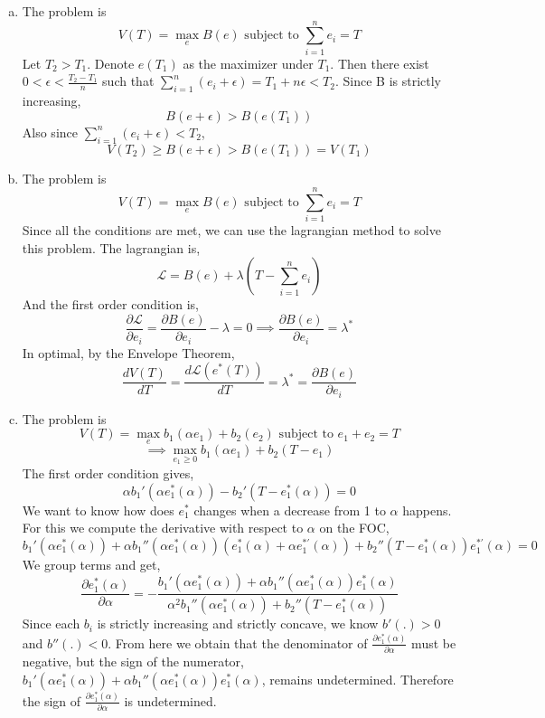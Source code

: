\documentclass{article}
\begin{document}
\begin{enumerate}[(a)]
    \item The problem is
    \[V(T) = \max_{e}B(e) \text{ subject to } \sum_{i=1}^n e_i = T\]
    Let $T_2 > T_1$. Denote $e(T_1)$ as the maximizer under $T_1$. Then there exist $0<\epsilon<\frac{T_2-T_1}{n}$ such that $\sum_{i=1}^n (e_i+\epsilon) = T_1 + n\epsilon < T_2$. Since B is strictly increasing,
    \[B(e+\epsilon) > B(e(T_1))\]
    Also since $\sum_{i=1}^n (e_i+\epsilon) < T_2$,
    \[V(T_2) \geq B(e+\epsilon) >B(e(T_1)) = V(T_1)\]

    \item The problem is
    \[V(T) = \max_{e}B(e) \text{ subject to } \sum_{i=1}^n e_i = T\]
    Since all the conditions are met, we can use the lagrangian method to solve this problem. The lagrangian is,
    \[\mathcal{L} = B(e) + \lambda(T-\sum_{i=1}^n e_i)\]
    And the first order condition is,
    \[\frac{\partial\mathcal{L}}{\partial e_i} = \frac{\partial B(e)}{\partial e_i} - \lambda = 0 \implies \frac{\partial B(e)}{\partial e_i} = \lambda^*\]
    In optimal, by the Envelope Theorem,
    \[\frac{dV(T)}{dT} = \frac{d\mathcal{L}(e^*(T))}{dT} = \lambda^* = \frac{\partial B(e)}{\partial e_i} \]

    \item The problem is
        \[V(T) = \max_{e}b_1(\alpha e_1) + b_2(e_2) \text{ subject to } e_1 + e_2 = T\]
        \[\implies \max_{e_1 \geq 0} b_1(\alpha e_1) + b_2(T-e_1)\]
    The first order condition gives,
    \[\alpha b_1'(\alpha e_1^*(\alpha)) - b_2'(T-e_1^*(\alpha)) = 0\]
    We want to know how does $e_1^*$ changes when a decrease from 1 to $\alpha$ happens. For this we compute the derivative with respect to $\alpha$ on the FOC,
    \[b_1'(\alpha e_1^*(\alpha)) + \alpha b_1''(\alpha e_1^*(\alpha))(e_1^*(\alpha)+\alpha e_1^{*'}(\alpha)) + b_2''(T-e_1^*(\alpha))e_1^{*'}(\alpha) = 0\]
    We group terms and get,
    \[\frac{\partial e_1^*(\alpha)}{\partial \alpha} = -\frac{b_1'(\alpha e_1^*(\alpha)) + \alpha b_1''(\alpha e_1^*(\alpha))e_1^*(\alpha) }{\alpha^2 b_1''(\alpha e_1^*(\alpha)) + b_2''(T-e_1^*(\alpha))}\]
    Since each $b_i$ is strictly increasing and strictly concave, we know $b'(.) >0$ and $b''(.)<0$. From here we obtain that the denominator of $\frac{\partial e_1^*(\alpha)}{\partial \alpha}$ must be negative, but the sign of the numerator, $b_1'(\alpha e_1^*(\alpha)) + \alpha b_1''(\alpha e_1^*(\alpha))e_1^*(\alpha)$, remains undetermined. Therefore the sign of $\frac{\partial e_1^*(\alpha)}{\partial \alpha}$ is undetermined. 

    
\end{enumerate}
\end{document}
